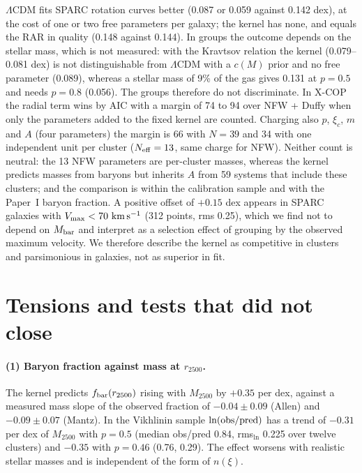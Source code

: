 \documentclass[11pt,a4paper]{article}
\newcommand{\fbar}{f_{\rm bar}}
\begin{document}
$\Lambda$CDM fits SPARC rotation curves better (0.087 or 0.059 against 0.142 dex), at the cost of one or two free parameters per galaxy; the kernel has none, and equals the RAR in quality (0.148 against 0.144). In groups the outcome depends on the stellar mass, which is not measured: with the Kravtsov relation the kernel (0.079--0.081 dex) is not distinguishable from $\Lambda$CDM with a $c(M)$ prior and no free parameter (0.089), whereas a stellar mass of 9\% of the gas gives 0.131 at $p=0.5$ and needs $p=0.8$ (0.056). The groups therefore do not discriminate. In X-COP the radial term wins by AIC with a margin of 74 to 94 over NFW + Duffy when only the parameters added to the fixed kernel are counted. Charging also $p$, $\xi_c$, $m$ and $A$ (four parameters) the margin is 66 with $N=39$ and 34 with one independent unit per cluster ($N_{\rm eff}=13$, same charge for NFW). Neither count is neutral: the 13 NFW parameters are per-cluster masses, whereas the kernel predicts masses from baryons but inherits $A$ from 59 systems that include these clusters; and the comparison is within the calibration sample and with the Paper~I baryon fraction. A positive offset of $+0.15$ dex appears in SPARC galaxies with $V_{\max}<70\ {\rm km\,s^{-1}}$ (312 points, rms 0.25), which we find not to depend on $M_{\rm bar}$ and interpret as a selection effect of grouping by the observed maximum velocity. We therefore describe the kernel as competitive in clusters and parsimonious in galaxies, not as superior in fit.

\section{Tensions and tests that did not close}
\label{sec:tensions}
\paragraph{(1) Baryon fraction against mass at $r_{2500}$.} The kernel predicts $\fbar(r_{2500})$ rising with $M_{2500}$ by $+0.35$ per dex, against a measured mass slope of the observed fraction of $-0.04\pm0.09$ (Allen) and $-0.09\pm0.07$ (Mantz). In the Vikhlinin sample $\ln({\rm obs}/{\rm pred})$ has a trend of $-0.31$ per dex of $M_{2500}$ with $p=0.5$ (median obs/pred 0.84, rms$_{\ln}$ 0.225 over twelve clusters) and $-0.35$ with $p=0.46$ (0.76, 0.29). The effect worsens with realistic stellar masses and is independent of the form of $n(\xi)$.
\end{document}
